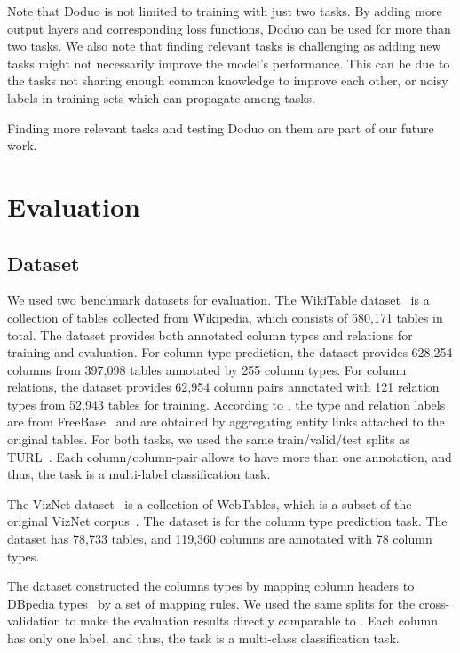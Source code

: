 \documentclass[sigconf]{acmart}
\newcommand{\name}{\mbox{\sc Doduo}}
\newcommand{\rev}[1]{#1}
\begin{document}
Note that \name{} is not limited to training with just two tasks. By adding more output layers and corresponding loss functions, \name{} can be used for more than two tasks.
%
\rev{We also note that finding relevant tasks is challenging
as adding new tasks might not
necessarily improve the model's performance. This can be due to the tasks not sharing enough common knowledge to improve each other,
or noisy labels in training sets which can propagate among tasks.
}
Finding more relevant tasks and testing \name{} on them are part of our future work. 
%





\section{Evaluation} \label{sec:experiment}

\subsection{Dataset}\label{sec:datasets}
We used two benchmark datasets for evaluation. The WikiTable dataset~\cite{Deng:2020:TURL} is a collection of tables collected from Wikipedia, which consists of 580,171 tables in total. 
\rev{The dataset provides both annotated column types and relations
for training and evaluation.
For column type prediction, the dataset provides 
628,254 columns from 397,098 tables annotated by 255 
column types.
For column relations, the dataset provides 62,954 column pairs 
annotated with 121 relation types
from 52,943 tables for training.
According to \cite{Deng:2020:TURL},
the type and relation labels are from FreeBase~\cite{bollacker2008freebase} and are
obtained by aggregating entity links attached to the original tables.}
%
For both tasks, we used the same train/valid/test splits as TURL~\cite{Deng:2020:TURL}.
%
Each column/column-pair allows to have more than one annotation, and thus, the task is a multi-label classification task.

The VizNet dataset~\cite{Zhang:2020:Sato} is a collection of WebTables, which is a subset of the original VizNet corpus~\cite{Hu:2019:CHI:VizNet}. The dataset is for the column type prediction task. The dataset has 78,733 tables, and 119,360 columns are annotated with 78 column types. 
\rev{
The dataset constructed the columns types
by mapping column headers to DBpedia 
types~\cite{Nguyen:2020:MTab4DBPedia} by a set of mapping rules.}
%
We used the same splits for the cross-validation to make the evaluation results directly comparable to \cite{Zhang:2020:Sato}.
%
Each column has only one label, and thus, the task is a multi-class classification task. 
\end{document}
